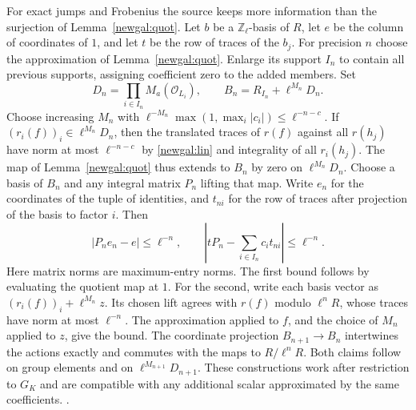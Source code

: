 For exact jumps and Frobenius the source keeps more information than the
surjection of Lemma~\ref{newgal:quot}. Let $b$ be a $\mathbb Z_\ell$-basis
of $R$, let $e$ be the column of coordinates of $1$, and let $t$ be the
row of traces of the $b_j$. For precision $n$ choose the approximation of
Lemma~\ref{newgal:quot}. Enlarge its support $I_n$ to contain all previous
supports, assigning coefficient zero to the added members. Set
\[
 D_n=\prod_{i\in I_n}M_a(\mathcal O_{L_i}),\qquad
 B_n=R_{I_n}+\ell^{M_n}D_n .
\]
Choose increasing $M_n$ with $\ell^{-M_n}\max(1,\max_i|c_i|)
\le\ell^{-n-c}$. If $(r_i(f))_i\in\ell^{M_n}D_n$, then the
translated traces of $r(f)$ against all $r(h_j)$ have norm at most
$\ell^{-n-c}$ by \eqref{newgal:lin} and integrality of all $r_i(h_j)$.
The map of Lemma~\ref{newgal:quot} thus extends to $B_n$ by zero on
$\ell^{M_n}D_n$. Choose a basis of $B_n$ and any integral matrix $P_n$
lifting that map. Write $e_n$ for the coordinates of the tuple of identities,
and $t_{ni}$ for the row of traces after projection of the basis to factor $i$.
Then
\begin{equation}\label{newgal:marked}
 |P_ne_n-e|\le\ell^{-n},\qquad
 \left|tP_n-\sum_{i\in I_n}c_i t_{ni}\right|\le\ell^{-n}.
\end{equation}
Here matrix norms are maximum-entry norms. The first bound follows
by evaluating the quotient map at $1$. For the second, write each basis
vector as $(r_i(f))_i+\ell^{M_n}z$. Its chosen lift agrees with $r(f)$ modulo
$\ell^nR$, whose traces have norm at most $\ell^{-n}$. The approximation
applied to $f$, and the choice of $M_n$ applied to $z$, give the bound.
The coordinate projection $B_{n+1}\to B_n$ intertwines the actions exactly
and commutes with the maps to $R/\ell^n R$. Both claims follow on group
elements and on $\ell^{M_{n+1}}D_{n+1}$. These constructions work after
restriction to $G_K$ and are compatible with any additional scalar
approximated by the same coefficients.
.

